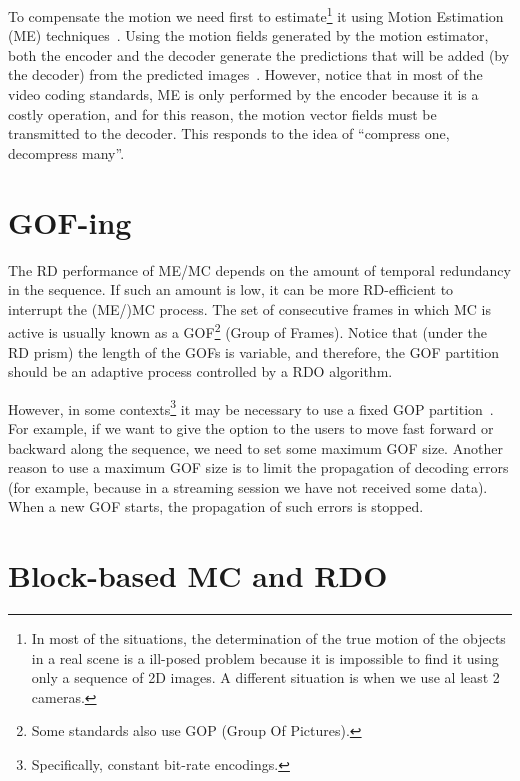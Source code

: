 To compensate the motion we need first to estimate\footnote{In most of
  the situations, the determination of the true motion of the objects
  in a real scene is a ill-posed problem because it is impossible to
  find it using only a sequence of 2D images. A different situation is
  when we use al least 2 cameras.} it using Motion Estimation (ME)
techniques~\cite{vruiz__ME}. Using the motion fields generated by the
motion estimator, both the encoder and the decoder generate the
predictions that will be added (by the
decoder) from the predicted images~\cite{vruiz__MC}. However, notice
that in most of the video coding standards, ME is only performed by
the encoder because it is a costly operation, and for this reason, the
motion vector fields must be transmitted to the decoder. This responds
to the idea of ``compress one, decompress many''.


\section{GOF-ing}

The RD performance of ME/MC depends on the amount of temporal
redundancy in the sequence. If such an amount is low, it can be more
RD-efficient to interrupt the (ME/)MC process. The set of consecutive
frames in which MC is active is usually known as a GOF\footnote{Some
  standards also use GOP (Group Of Pictures).} (Group of
Frames). Notice that (under the RD prism) the length of the GOFs is
variable, and therefore, the GOF partition should be an adaptive
process controlled by a RDO algorithm.

However, in some contexts\footnote{Specifically, constant bit-rate
  encodings.} it may be necessary to use a fixed GOP
partition~\cite{vruiz__MC}. For example, if we want to give the option
to the users to move fast forward or backward along the sequence, we
need to set some maximum GOF size. Another reason to use a maximum GOF
size is to limit the propagation of decoding errors (for example,
because in a streaming session we have not received some data). When a
new GOF starts, the propagation of such errors is stopped.

\section{Block-based MC and RDO}

